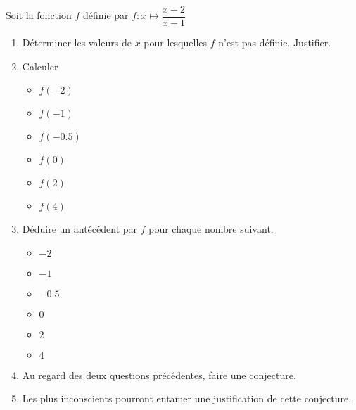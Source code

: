 \begin{exercice}
    Soit la fonction $f$ définie par $f:x\longmapsto\dfrac{x+2}{x-1}$
    \begin{enumerate}
        \item Déterminer les valeurs de $x$ pour lesquelles $f$ n'est pas définie. Justifier.
        \item Calculer
        \begin{multicols}{2}
            \begin{itemize}
                \item $f(-2)$
                \item $f(-1)$
                \item $f(\num{-0.5})$
                \item $f(0)$
                \item $f(2)$
                \item $f(4)$
            \end{itemize}               
        \end{multicols}
        \item Déduire un antécédent par $f$ pour chaque nombre suivant.
        \begin{multicols}{2}
            \begin{itemize}
                \item $-2$
                \item $-1$
                \item $\num{-0.5}$
                \item $0$
                \item $2$
                \item $4$
            \end{itemize}               
        \end{multicols}
        \item Au regard des deux questions précédentes, faire une conjecture.
        \item Les plus inconscients pourront entamer une justification de cette conjecture.
    \end{enumerate}    
\end{exercice}
